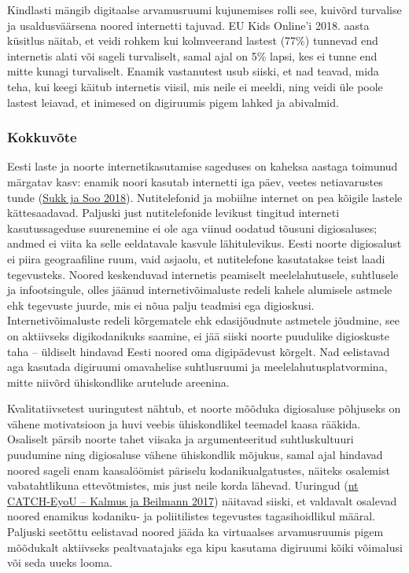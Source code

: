 \documentclass[estonian,]{article}
\begin{document}
Kindlasti mängib digitaalse arvamusruumi kujunemises rolli see, kuivõrd turvalise ja usaldusväärsena noored internetti tajuvad. EU Kids Online'i 2018. aasta küsitlus näitab, et veidi rohkem kui kolmveerand lastest (77\%) tunnevad end internetis alati või sageli turvaliselt, samal ajal on 5\% lapsi, kes ei tunne end mitte kunagi turvaliselt. Enamik vastanutest usub siiski, et nad teavad, mida teha, kui keegi käitub internetis viisil, mis neile ei meeldi, ning veidi üle poole lastest leiavad, et inimesed on digiruumis pigem lahked ja abivalmid.

\hypertarget{kokkuvuxf5te-12}{%
\subsubsection*{Kokkuvõte}\label{kokkuvuxf5te-12}}

Eesti laste ja noorte internetikasutamise sageduses on kaheksa aastaga toimunud märgatav kasv: enamik noori kasutab internetti iga päev, veetes netiavarustes tunde (\protect\hyperlink{Sukk2018}{Sukk ja Soo 2018}). Nutitelefonid ja mobiilne internet on pea kõigile lastele kättesaadavad. Paljuski just nutitelefonide levikust tingitud interneti kasutussageduse suurenemine ei ole aga viinud oodatud tõusuni digiosaluses; andmed ei viita ka selle eeldatavale kasvule lähitulevikus. Eesti noorte digiosalust ei piira geograafiline ruum, vaid asjaolu, et nutitelefone kasutatakse teist laadi tegevusteks. Noored keskenduvad internetis peamiselt meelelahutusele, suhtlusele ja infootsingule, olles jäänud internetivõimaluste redeli kahele alumisele astmele ehk tegevuste juurde, mis ei nõua palju teadmisi ega digioskusi. Internetivõimaluste redeli kõrgematele ehk edasijõudnute astmetele jõudmine, see on aktiivseks digikodanikuks saamine, ei jää siiski noorte puudulike digioskuste taha -- üldiselt hindavad Eesti noored oma digipädevust kõrgelt. Nad eelistavad aga kasutada digiruumi omavahelise suhtlusruumi ja meelelahutusplatvormina, mitte niivõrd ühiskondlike arutelude areenina.

Kvalitatiivsetest uuringutest nähtub, et noorte mõõduka digiosaluse põhjuseks on vähene motivatsioon ja huvi veebis ühiskondlikel teemadel kaasa rääkida. Osaliselt pärsib noorte tahet viisaka ja argumenteeritud suhtluskultuuri puudumine ning digiosaluse vähene ühiskondlik mõjukus, samal ajal hindavad noored sageli enam kaasalöömist päriselu kodanikualgatustes, näiteks osalemist vabatahtlikuna ettevõtmistes, mis just neile korda lähevad. Uuringud (\protect\hyperlink{Kalmus2017}{nt CATCH-EyoU -- Kalmus ja Beilmann 2017}) näitavad siiski, et valdavalt osalevad noored enamikus kodaniku- ja poliitilistes tegevustes tagasihoidlikul määral. Paljuski seetõttu eelistavad noored jääda ka virtuaalses arvamusruumis pigem mõõdukalt aktiivseks pealtvaatajaks ega kipu kasutama digiruumi kõiki võimalusi või seda uueks looma.
\end{document}
